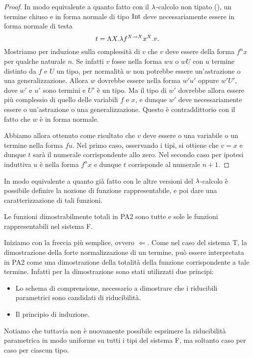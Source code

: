 \documentclass[]{marticle}
\begin{document}
\begin{proof}
    In modo equivalente a quanto fatto con il $\lambda$-calcolo non tipato
    (), un termine chiuso e in forma normale di tipo
    $\text{Int}$ deve necessariamente essere in forma normale di testa 
    \[
        t = \Lambda X. \lambda f^{X\rightarrow X} x^X. v.
    \]
    Mostriamo per induzione sulla complessit\`a di $v$ che $v$ deve essere della
    forma $f^nx$ per qualche naturale $n$.
    Se infatti $v$ fosse nella forma $wu$ o $wU$ con $u$ termine distinto da $f$
    e $U$ un tipo, per normalit\`a $w$ non potrebbe essere un'astrazione o una
    generalizzazione. Allora $w$ dovrebbe essere nella forma $w'u'$ oppure
    $w'U'$, dove $w'$ e $u'$ sono termini e $U'$ \`e un tipo. Ma il tipo di $w'$
    dovrebbe allora essere pi\`u complessio di quello delle variabili $f$ e $x$,
    e dunque $w'$ deve necessariamente essere o un'astrazione o una
    generalizzazione. Questo \`e contraddittorio con il fatto che $w$ \`e in
    forma normale. 

    Abbiamo allora ottenuto come risultato che $v$ deve essere o una variabile o
    un termine nella forma $fu$. Nel primo caso, osservando i tipi, si ottiene
    che $v=x$ e dunque $t$ sar\`a il numerale corrispondente allo zero. Nel
    secondo caso per ipotesi induttiva $u$ \`e nella forma $f^nx$ e dunque $t$
    corrisponde al numerale $n+1$.
\end{proof}

In modo equivalente a quanto gi\`a fatto con le altre versioni del $\lambda$-calcolo
\`e possibile definire la nozione di funzione rappresentabile, e poi dare una
caratterizzazione di tali funzioni.

\begin{block}[Teorema]
    Le funzioni dimostrabilmente totali in PA2 sono tutte e sole le
    funzioni rappresentabili nel sistema F.
\end{block}

Iniziamo con la freccia pi\`u semplice, ovvero $\Leftarrow$. Come nel caso del
sistema T, la dimostrazione della forte normalizzazione di un termine, pu\`o
essere interpretata in PA2 come una dimostrazione della totalit\`a della
funzione corrispondente a tale termine. Infatti per la dimostrazione sono stati
utilizzati due principi:
\begin{itemize}
    \item Lo schema di comprensione, necessario a dimostrare che i riducibili
        parametrici sono candidati di riducibilit\`a. 
    \item Il principio di induzione.
\end{itemize}
Notiamo che tuttavia non \`e nuovamente possibile esprimere la riducibilit\`a
parametrica in modo uniforme su tutti i tipi del sistema F, ma soltanto caso per
caso per ciascun tipo.
\end{document}
